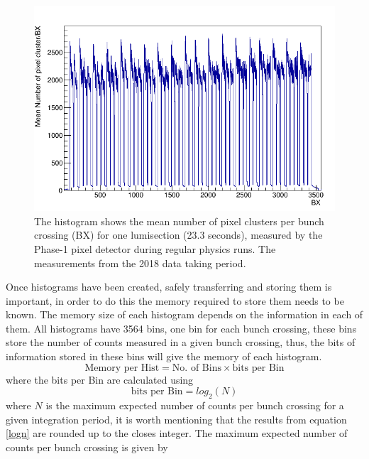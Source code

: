 \begin{center}
    \begin{figure}[H]
        \centering
        \includegraphics[scale=0.5]{Chapter3/histbx.png}
        \caption[Histogram of the mean number of pixel clusters per bunch crossing (BX) measured by the Phase-1 pixel detector.]{The histogram shows the mean number of pixel clusters per bunch crossing (BX) for one lumisection (23.3 seconds), measured by the Phase-1 pixel detector during regular physics runs. The measurements from the 2018 data taking period.}
        \label{histhit}
    \end{figure}
\end{center}
Once histograms have been created, safely transferring and storing them is important, in order to do this the memory required to store them needs to be known. The memory size of each histogram depends on the information in each of  them. All histograms have 3564 bins, one bin for each bunch crossing, these bins store the number of counts measured in a given bunch crossing, thus, the bits of information stored in these bins will give the memory of each histogram.
\begin{equation}
    \text {Memory per Hist}= \text {No. of Bins}\times \text {bits per Bin}
    \label{histm}
\end{equation}
 where the bits per Bin are calculated using 
 \begin{equation}
     \text {bits per Bin}= log_2(N)
     \label{logn}
 \end{equation}
where $N$ is the maximum expected number of counts per bunch crossing for a given integration period, it is worth mentioning that the results from equation \ref{logn} are rounded up to the closes integer. The maximum expected number of counts per bunch crossing is given by 

